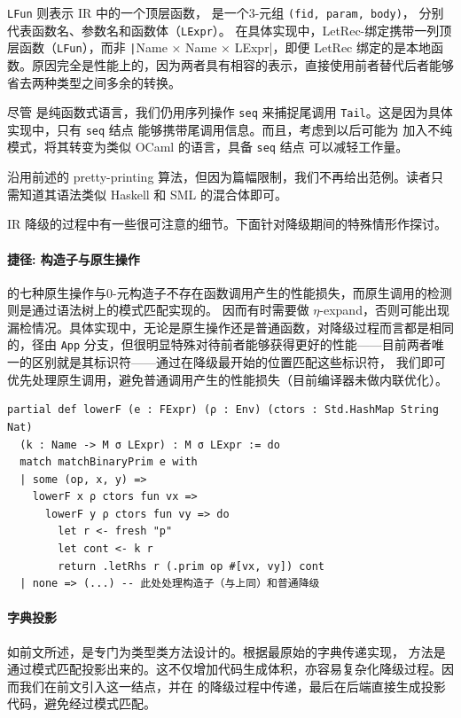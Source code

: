 \texttt{LFun} 则表示 IR 中的一个顶层函数，
是一个3-元组 \texttt{(fid, param, body)}，
分别代表函数名、参数名和函数体（\texttt{LExpr}）。
在具体实现中，LetRec-绑定携带一列顶层函数（\texttt{LFun}），而非 \texttt|Name × Name × LExpr|，即便
LetRec 绑定的是本地函数。原因完全是性能上的，因为两者具有相容的表示，直接使用前者替代后者能够省去两种类型之间多余的转换。

尽管 \Tigris 是纯函数式语言，我们仍用序列操作 \texttt{seq} 来捕捉尾调用 \texttt{Tail}。这是因为具体实现中，只有 \texttt{seq} 结点
能够携带尾调用信息。而且，考虑到以后可能为 \Tigris 加入不纯模式，将其转变为类似 OCaml 的语言，具备 \texttt{seq} 结点
可以减轻工作量。

\Lambdair 沿用前述的 pretty-printing 算法，但因为篇幅限制，我们不再给出范例。读者只需知道其语法类似 Haskell 和 SML 的混合体即可。

IR 降级的过程中有一些很可注意的细节。下面针对降级期间的特殊情形作探讨。

\paragraph{捷径: 构造子与原生操作}
\Tigris 的七种原生操作与0-元构造子不存在函数调用产生的性能损失，而原生调用的检测则是通过语法树上的模式匹配实现的。
因而有时需要做 $\eta$-expand，否则可能出现漏检情况。具体实现中，无论是原生操作还是普通函数，对降级过程而言都是相同的，径由
\texttt{App} 分支，但很明显特殊对待前者能够获得更好的性能——目前两者唯一的区别就是其标识符——通过在降级最开始的位置匹配这些标识符，
我们即可优先处理原生调用，避免普通调用产生的性能损失（目前编译器未做内联优化）。

\begin{verbatim}
partial def lowerF (e : FExpr) (ρ : Env) (ctors : Std.HashMap String Nat)
  (k : Name -> M σ LExpr) : M σ LExpr := do
  match matchBinaryPrim e with
  | some (op, x, y) =>
    lowerF x ρ ctors fun vx =>
      lowerF y ρ ctors fun vy => do
        let r <- fresh "p"
        let cont <- k r
        return .letRhs r (.prim op #[vx, vy]) cont
  | none => (...) -- 此处处理构造子（与上同）和普通降级
\end{verbatim}

\paragraph{字典投影} 如前文所述，是专门为类型类方法设计的。根据最原始的字典传递实现，
方法是通过模式匹配投影出来的。这不仅增加代码生成体积，亦容易复杂化降级过程。因而我们在前文引入这一结点，并在
\Lambdair 的降级过程中传递，最后在后端直接生成投影代码，避免经过模式匹配。

